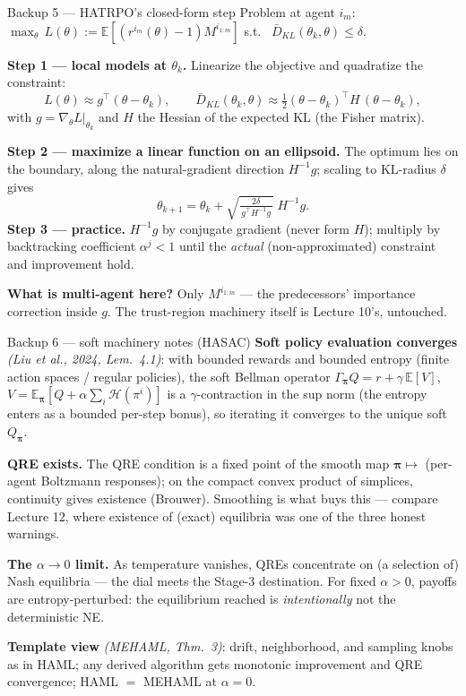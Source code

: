 \documentclass[10pt, aspectratio=169]{beamer}
\newcommand{\paper}[1]{\textcolor{mLightBrown}{\small\textit{(#1)}}}
\begin{document}
\begin{frame}{Backup 5 --- HATRPO's closed-form step}
\footnotesize
Problem at agent $i_m$: \; $\max_{\theta}\, L(\theta) := \mathbb{E}[(r^{i_m}(\theta)-1)M^{i_{1:m}}]$ \; s.t.\ \; $\bar D_{KL}(\theta_k, \theta) \le \delta$.
\medskip

\textbf{Step 1 --- local models at $\theta_k$.} Linearize the objective and quadratize the constraint:
\[
L(\theta) \approx g^{\top}(\theta - \theta_k), \qquad
\bar D_{KL}(\theta_k,\theta) \approx \tfrac12 (\theta-\theta_k)^{\top} H\, (\theta-\theta_k),
\]
with $g = \nabla_\theta L|_{\theta_k}$ and $H$ the Hessian of the expected KL (the Fisher matrix).
\medskip

\textbf{Step 2 --- maximize a linear function on an ellipsoid.} The optimum lies on the boundary, along the natural-gradient direction $H^{-1}g$; scaling to KL-radius $\delta$ gives
\[
\theta_{k+1} = \theta_k + \sqrt{\tfrac{2\delta}{\,g^{\top}H^{-1}g\,}}\; H^{-1}g.
\]
\textbf{Step 3 --- practice.} $H^{-1}g$ by conjugate gradient (never form $H$); multiply by backtracking coefficient $\alpha^{j} < 1$ until the \emph{actual} (non-approximated) constraint and improvement hold.
\medskip

\textbf{What is multi-agent here?} Only $M^{i_{1:m}}$ --- the predecessors' importance correction inside $g$. The trust-region machinery itself is Lecture 10's, untouched.
\end{frame}

\begin{frame}{Backup 6 --- soft machinery notes (HASAC)}
\footnotesize
\textbf{Soft policy evaluation converges} \paper{Liu et al., 2024, Lem.\ 4.1}: with bounded rewards and bounded entropy (finite action spaces / regular policies), the soft Bellman operator
$\Gamma_{\bm\pi}Q = r + \gamma\,\mathbb{E}[V]$, $V = \mathbb{E}_{\bm\pi}[Q + \alpha\sum_i\mathcal{H}(\pi^i)]$
is a $\gamma$-contraction in the sup norm (the entropy enters as a bounded per-step bonus), so iterating it converges to the unique soft $Q_{\bm\pi}$.
\medskip

\textbf{QRE exists.} The QRE condition is a fixed point of the smooth map $\bm\pi \mapsto$ (per-agent Boltzmann responses); on the compact convex product of simplices, continuity gives existence (Brouwer). Smoothing is what buys this --- compare Lecture 12, where existence of (exact) equilibria was one of the three honest warnings.
\medskip

\textbf{The $\alpha \to 0$ limit.} As temperature vanishes, QREs concentrate on (a selection of) Nash equilibria --- the dial meets the Stage-3 destination. For fixed $\alpha > 0$, payoffs are entropy-perturbed: the equilibrium reached is \emph{intentionally} not the deterministic NE.
\medskip

\textbf{Template view} \paper{MEHAML, Thm.\ 3}: drift, neighborhood, and sampling knobs as in HAML; any derived algorithm gets monotonic improvement and QRE convergence; HAML $=$ MEHAML at $\alpha = 0$.
\end{frame}
\end{document}
